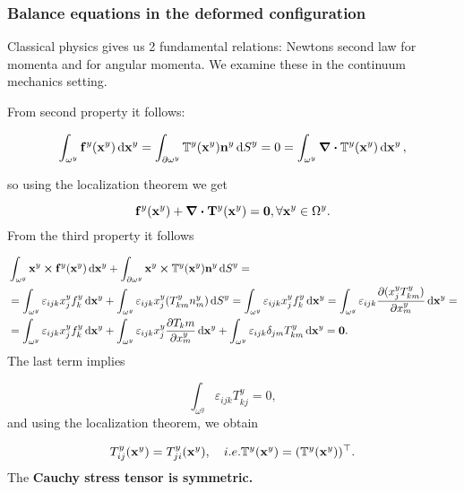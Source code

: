 \documentclass[reqno, a4paper]{article}
\begin{document}
\subsubsection{Balance equations in the deformed configuration}
\label{sec:balance_equations_cauchy}
Classical physics gives us 2 fundamental relations: Newtons second law for momenta and for angular momenta. We examine these in the continuum mechanics setting.

From second property it follows:

\begin{equation}
	\int_{\omega^y} \vb{f}^y(\vb{x}^y) \dd{\vb{x}^y} = \int_{\partial \omega^y} \tensorq{T}^y(\vb{x}^y) \vb{n}^y \dd{S}^y = 0 = \int_{\omega^y} \divergence{\tensorq{T}^y}(\vb{x}^{y}) \dd{\vb{x}^{y}},
\end{equation}

so using the localization theorem we get

\begin{equation*}
	\label{eqn:balanceofforces}
	\vb{f}^y(\vb{x}^y) + \divergence{\vb{T}^y}(\vb{x}^y) = \vb{0}, \forall \vb{x}^y \in \Omega^y.
\end{equation*}
From the third property it follows

\begin{align*}
&	\int_{\omega^y} \vb{x}^y \cross \vb{f}^y(\vb{x}^y) \dd{\vb{x}^y} + \int_{\partial \omega^y} \vb{x}^y \cross \mathbb{T}^y(\vb{x}^y) \vb{n}^{y} \dd{S}^y = \\ &= \int_{\omega^y} \varepsilon_{ijk} x^y_j f^y_k \dd{\vb{x}^y} + \int_{\omega^y}\varepsilon_{ijk}x^y_j (T^y_{km} n^y_m) \dd{S}^y = \int_{\omega^y} \varepsilon_{ijk} x^y_j f^y_k \dd{\vb{x}^y}=\int_{\omega^y} \varepsilon_{ijk} \pdv{(x^y_j T^y_{km})}{x^y_m}\dd{\vb{x}^y} = \\& = \int_{\omega^y}\varepsilon_{ijk}x^y_j f^y_k \dd{\vb{x}^y} + \int_{\omega^y}\varepsilon_{ijk}x^y_j \pdv{T_km}{x^y_m}\dd{\vb{x}^y} + \int_{\omega^y}\varepsilon_{ijk}\delta_{jm}T^y_{km} \dd{\vb{x}^y} = \vb{0}.
\end{align*}
The last term implies

\begin{equation*}
	\int_{\omega^y} \varepsilon_{ijk}T^y_{kj} = 0,
\end{equation*}
and using the localization theorem, we obtain

\begin{equation}
	T^y_{ij} (\vb{x}^y) = T^y_{ji}(\vb{x}^y), \quad{i.e.} \mathbb{T}^y(\vb{x}^y) = (\mathbb{T}^y(\vb{x}^y))^\top.
\end{equation}
The \textbf{Cauchy stress tensor is symmetric.}
\end{document}
